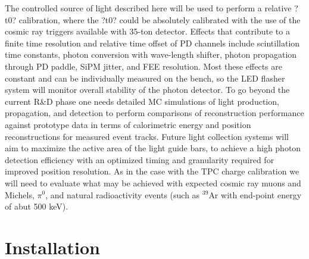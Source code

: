 The controlled source of light described here will be used to perform
a relative ?t0? calibration, where the ?t0? could be absolutely
calibrated with the use of the cosmic ray triggers available with
35-ton detector. Effects that contribute to a finite time resolution
and relative time offset of PD channels include scintillation time
constants, photon conversion with wave-length shifter, photon
propagation through PD paddle, SiPM jitter, and FEE resolution. Most
these effects are constant and can be individually measured on the
bench, so the LED flasher system will monitor overall stability of the
photon detector.  To go beyond the current R\&D phase one needs
detailed MC simulations of light production, propagation, and
detection to perform comparisons of reconstruction performance against
prototype data in terms of calorimetric energy and position
reconstructions for measured event tracks. Future light collection
systems will aim to maximize the active area of the light guide bars,
to achieve a high photon detection efficiency with an optimized timing
and granularity required for improved position resolution. As in the
case with the TPC charge calibration we will need to evaluate what may
be achieved with expected cosmic ray muons and Michels, $\pi^0$, and
natural radioactivity events (such as $^{39}$Ar with end-point energy
of abut 500 keV).


\section{Installation}







